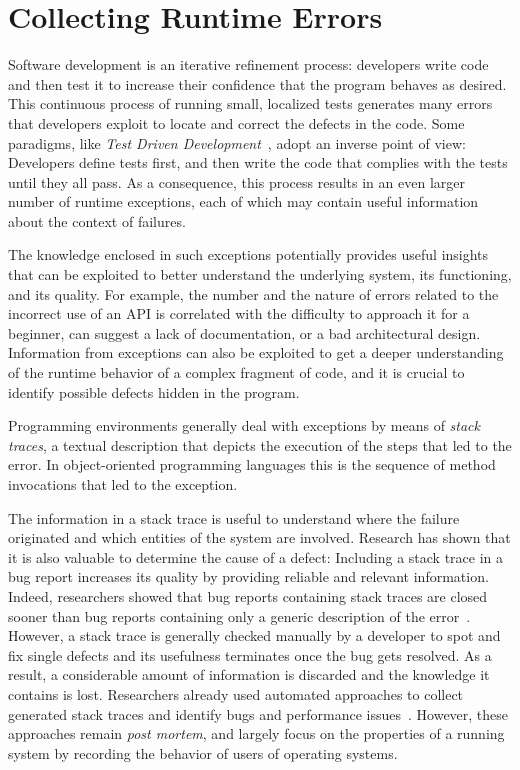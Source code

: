 \newpage

\section{Collecting Runtime Errors} \label{sec:stacktraces-intro}

Software development is an iterative refinement process: developers write code and then test it to increase their confidence that the program behaves as desired.
This continuous process of running small, localized tests generates many errors that developers exploit to locate and correct the defects in the code.
Some paradigms, like \emph{Test Driven Development}~\cite{BeckTDD}, adopt an inverse point of view: Developers define tests first, and then write the code that complies with the tests until they all pass.
As a consequence, this process results in an even larger number of runtime exceptions, each of which may contain useful information about the context of failures.

The knowledge enclosed in such exceptions potentially provides useful insights that can be exploited to better understand the underlying system, its functioning, and its quality.
For example, the number and the nature of errors related to the incorrect use of an API is correlated with the difficulty to approach it for a beginner, can suggest a lack of documentation, or a bad architectural design.
Information from exceptions can also be exploited to get a deeper understanding of the runtime behavior of a complex fragment of code, and it is crucial to identify possible defects hidden in the program.

Programming environments generally deal with exceptions by means of \emph{stack traces}, a textual description that depicts the execution of the steps that led to the error.
In object-oriented programming languages this is the sequence of method invocations that led to the exception.

The information in a stack trace is useful to understand where the failure originated and which entities of the system are involved.
Research has shown that it is also valuable to determine the cause of a defect: Including a stack trace in a bug report increases its quality by providing reliable and relevant information.
Indeed, researchers showed that bug reports containing stack traces are closed sooner than bug reports containing only a generic description of the error~\cite{Zimm2010a,Schr2010a}.
However, a stack trace is generally checked manually by a developer to spot and fix single defects and its usefulness terminates once the bug gets resolved.
As a result, a considerable amount of information is discarded and the knowledge it contains is lost.
Researchers already used automated approaches to collect generated stack traces and identify bugs and performance issues~\cite{Glerum2009,Han2012}.
However, these approaches remain \emph{post mortem}, and largely focus on the properties of a running system by recording the behavior of users of operating systems.


